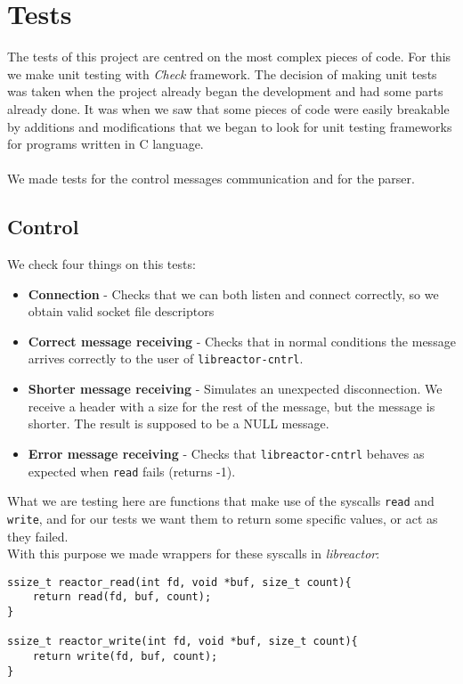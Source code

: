 \section{Tests}
The tests of this project are centred on the most complex pieces of code. For this we make unit testing with \emph{Check} framework.
The decision of making unit tests was taken when the project already began the development and had some parts already done. It was when 
we saw that some pieces of code were easily breakable by additions and modifications that we began to look for unit testing
frameworks for programs written in C language.\\
\\
We made tests for the control messages communication and for the parser.
\subsection{Control}
We check four things on this tests:
\begin{itemize}
  \item {\bf Connection} - Checks that we can both listen and connect correctly, so we obtain valid socket file descriptors
  \item {\bf Correct message receiving} - Checks that in normal conditions the message arrives correctly to the user of 
    \texttt{libreactor-cntrl}.
  \item {\bf Shorter message receiving} - Simulates an unexpected disconnection. We receive a header with a size for the rest of the
    message, but the message is shorter. The result is supposed to be a NULL message.
  \item {\bf Error message receiving} - Checks that \texttt{libreactor-cntrl} behaves as expected when \texttt{read} fails 
    (returns -1).
\end{itemize}
What we are testing here are functions that make use of the syscalls \texttt{read} and \texttt{write}, and for our tests we want them to
return some specific values, or act as they failed.\\
With this purpose we made wrappers for these syscalls in \emph{libreactor}:
\begin{verbatim}
ssize_t reactor_read(int fd, void *buf, size_t count){
    return read(fd, buf, count);
}

ssize_t reactor_write(int fd, void *buf, size_t count){
    return write(fd, buf, count);
}
\end{verbatim}
